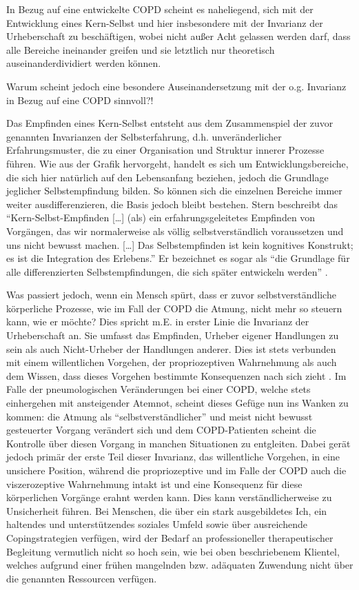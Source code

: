 In Bezug auf eine entwickelte COPD scheint es naheliegend, sich mit der Entwicklung eines Kern-Selbst und hier insbesondere mit der Invarianz der Urheberschaft zu beschäftigen, wobei nicht außer Acht gelassen werden darf, dass alle Bereiche ineinander greifen und sie letztlich nur theoretisch auseinanderdividiert werden können.

Warum scheint jedoch eine besondere Auseinandersetzung mit der o.g. Invarianz in Bezug auf eine COPD sinnvoll?!

Das Empfinden eines Kern-Selbst entsteht aus dem Zusammenspiel der zuvor genannten Invarianzen der Selbsterfahrung, d.h. unveränderlicher Erfahrungsmuster, die zu einer Organisation und Struktur innerer Prozesse führen. Wie aus der Grafik hervorgeht, handelt es sich um Entwicklungsbereiche, die sich hier natürlich auf den Lebensanfang beziehen, jedoch die Grundlage jeglicher Selbstempfindung bilden. So können sich die einzelnen Bereiche immer weiter ausdifferenzieren, die Basis jedoch bleibt bestehen. 
Stern beschreibt das "`Kern-Selbst-Empfinden […] (als) ein erfahrungsgeleitetes Empfinden von Vorgängen, das wir normalerweise als völlig selbstverständlich voraussetzen und uns nicht bewusst machen. […] Das Selbstempfinden ist kein kognitives Konstrukt; es ist die Integration des Erlebens."' \autocite[106f.]{stern2007} Er bezeichnet es sogar als "`die Grundlage für alle differenzierten Selbstempfindungen, die sich später entwickeln werden"' \autocite[106f.]{stern2007}. 

Was passiert jedoch, wenn ein Mensch spürt, dass er zuvor selbstverständliche körperliche Prozesse, wie im Fall der COPD die Atmung, nicht mehr so steuern kann, wie er möchte? Dies spricht m.E. in erster Linie die Invarianz der Urheberschaft an. Sie umfasst das Empfinden, Urheber eigener Handlungen zu sein als auch Nicht-Urheber der Handlungen anderer. Dies ist stets verbunden mit einem willentlichen Vorgehen, der propriozeptiven Wahrnehmung als auch dem Wissen, dass dieses Vorgehen bestimmte Konsequenzen nach sich zieht \autocite[vgl.][106, 114f.]{stern2007}. Im Falle der pneumologischen Veränderungen bei einer COPD, welche stets einhergehen mit ansteigender Atemnot, scheint dieses Gefüge nun ins Wanken zu kommen: die Atmung als "`selbstverständlicher"' und meist nicht bewusst gesteuerter Vorgang verändert sich und dem COPD-Patienten scheint die Kontrolle über diesen Vorgang in manchen Situationen zu entgleiten. Dabei gerät jedoch primär der erste Teil dieser Invarianz, das willentliche Vorgehen, in eine unsichere Position, während die propriozeptive und im Falle der COPD auch die viszerozeptive Wahrnehmung intakt ist und eine Konsequenz für diese körperlichen Vorgänge erahnt werden kann. Dies kann verständlicherweise zu Unsicherheit führen. Bei Menschen, die über ein stark ausgebildetes Ich, ein haltendes und unterstützendes soziales Umfeld sowie über ausreichende Copingstrategien verfügen, wird der Bedarf an professioneller therapeutischer Begleitung vermutlich nicht so hoch sein, wie bei oben beschriebenem Klientel, welches aufgrund einer frühen mangelnden bzw. adäquaten Zuwendung nicht über die genannten Ressourcen verfügen. 

